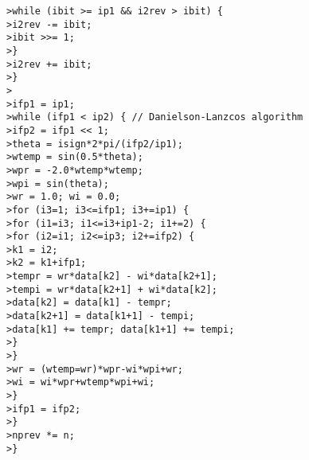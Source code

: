 \texttt{>\quad \qquad\qquad while (ibit >= ip1 \&\& i2rev > ibit) \{} \\
\texttt{>\quad \qquad\qquad\qquad i2rev -= ibit;} \\
\texttt{>\quad \qquad\qquad\qquad ibit >>= 1;} \\
\texttt{>\quad \qquad\qquad \}} \\
\texttt{>\quad \qquad\qquad i2rev += ibit;} \\
\texttt{>\quad \qquad \}} \\
\texttt{>\quad } \\
\texttt{>\quad \qquad ifp1 = ip1;} \\
\texttt{>\quad \qquad while (ifp1 < ip2) \{ // Danielson-Lanzcos algorithm} \\
\texttt{>\quad \qquad\qquad ifp2 = ifp1 << 1;} \\
\texttt{>\quad \qquad\qquad theta = isign*2*pi/(ifp2/ip1);} \\
\texttt{>\quad \qquad\qquad wtemp = sin(0.5*theta);} \\
\texttt{>\quad \qquad\qquad wpr = -2.0*wtemp*wtemp;} \\
\texttt{>\quad \qquad\qquad wpi = sin(theta);} \\
\texttt{>\quad \qquad\qquad wr = 1.0; wi = 0.0;} \\
\texttt{>\quad \qquad\qquad for (i3=1; i3<=ifp1; i3+=ip1) \{} \\
\texttt{>\quad \qquad\qquad\qquad for (i1=i3; i1<=i3+ip1-2; i1+=2) \{} \\
\texttt{>\quad \qquad\qquad\qquad\qquad for (i2=i1; i2<=ip3; i2+=ifp2) \{} \\
\texttt{>\quad \qquad\qquad\qquad\qquad\qquad k1 = i2;} \\
\texttt{>\quad \qquad\qquad\qquad\qquad\qquad k2 = k1+ifp1;} \\
\texttt{>\quad \qquad\qquad\qquad\qquad\qquad tempr = wr*data[k2] - wi*data[k2+1];} \\
\texttt{>\quad \qquad\qquad\qquad\qquad\qquad tempi = wr*data[k2+1] + wi*data[k2];} \\
\texttt{>\quad \qquad\qquad\qquad\qquad\qquad data[k2] = data[k1] - tempr;} \\
\texttt{>\quad \qquad\qquad\qquad\qquad\qquad data[k2+1] = data[k1+1] - tempi;} \\
\texttt{>\quad \qquad\qquad\qquad\qquad\qquad data[k1] += tempr; data[k1+1] += tempi;} \\
\texttt{>\quad \qquad\qquad\qquad\qquad \}} \\
\texttt{>\quad \qquad\qquad\qquad \}} \\
\texttt{>\quad \qquad\qquad\qquad wr = (wtemp=wr)*wpr-wi*wpi+wr;} \\
\texttt{>\quad \qquad\qquad\qquad wi = wi*wpr+wtemp*wpi+wi;} \\
\texttt{>\quad \qquad\qquad \}} \\
\texttt{>\quad \qquad\qquad ifp1 = ifp2;} \\
\texttt{>\quad \qquad \}} \\
\texttt{>\quad \qquad nprev *= n;} \\
\texttt{>\quad \}} \\


